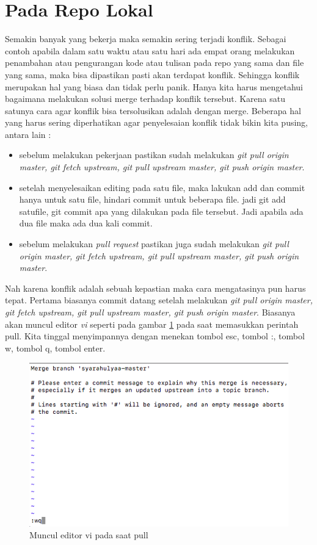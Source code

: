\section{Pada Repo Lokal}
Semakin banyak yang bekerja maka semakin sering terjadi konflik. Sebagai contoh apabila dalam satu waktu atau satu hari ada empat orang melakukan penambahan atau pengurangan kode atau tulisan pada repo yang sama dan file yang sama, maka bisa dipastikan pasti akan terdapat konflik. Sehingga konflik merupakan hal yang biasa dan tidak perlu panik. Hanya kita harus mengetahui bagaimana melakukan solusi merge terhadap konflik tersebut. Karena satu satunya cara agar konflik bisa tersolusikan adalah dengan merge. Beberapa hal yang harus sering diperhatikan agar penyelesaian konflik tidak bikin kita pusing, antara lain :
\begin{itemize}
	\item sebelum melakukan pekerjaan pastikan sudah melakukan \textit{git pull origin master, git fetch upstream, git pull upstream master, git push origin master}.
	\item setelah menyelesaikan editing pada satu file, maka lakukan add dan commit hanya untuk satu file, hindari commit untuk beberapa file. jadi git add satufile, git commit apa yang dilakukan pada file tersebut. Jadi apabila ada dua file maka ada dua kali commit.
	\item sebelum melakukan \textit{pull request} pastikan juga sudah melakukan \textit{git pull origin master, git fetch upstream, git pull upstream master, git push origin master}.
\end{itemize}
Nah karena konflik adalah sebuah kepastian maka cara mengatasinya pun harus tepat. Pertama biasanya commit datang setelah melakukan \textit{git pull origin master, git fetch upstream, git pull upstream master, git push origin master}.
Biasanya akan muncul editor \textit{vi} seperti pada gambar \ref{fig:editorvimergesimpan} pada saat memasukkan perintah pull. Kita tinggal menyimpannya dengan menekan tombol esc, tombol :, tombol w, tombol q, tombol enter.

\begin{figure}[!htbp]
\centerline{\includegraphics[width=.75\textwidth]{Figures/editorvimergesimpan}}
\caption{Muncul editor vi pada saat pull}
\label{fig:editorvimergesimpan}
\end{figure}

